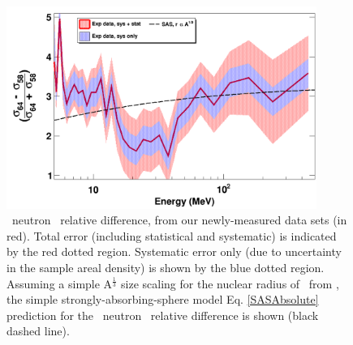 \begin{figure}[tb]
    \centering
    \includegraphics[width=0.9\textwidth]{figures/relativeDiff_Ni64Ni58.png}
    \caption[\niEightFour\ neutron \tot\ relative difference]
    {
        \niEightFour\ neutron \tot\ relative difference, from our newly-measured
        data sets (in red). Total error (including statistical and systematic)
        is indicated by the red dotted region. Systematic error only (due to
        uncertainty in the sample areal density) is shown by the blue dotted region.   
        Assuming a simple A$^{\frac{1}{3}}$ size scaling for the
        nuclear radius of \niFour\ from \niEight, the simple
        strongly-absorbing-sphere model Eq. \ref{SASAbsolute} prediction
        for the \niEightFour\ neutron \tot\ relative
        difference is shown (black dashed line).
    }
    \label{IsotopicDifferenceNi}
\end{figure}

